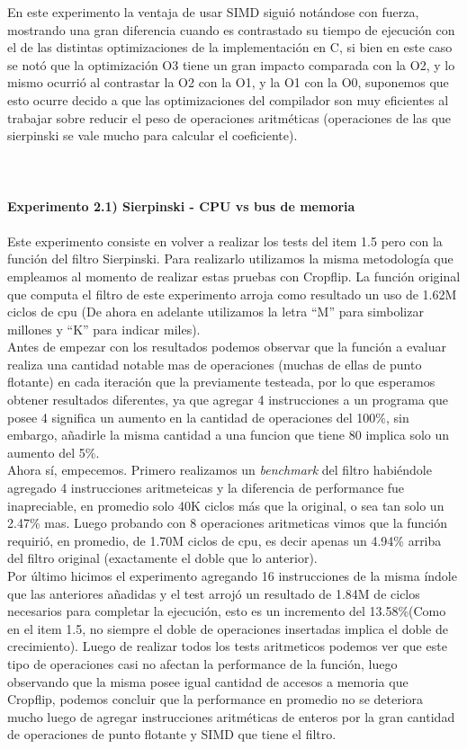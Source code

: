 \documentclass[a4paper]{article}
\begin{document}
En este experimento la ventaja de usar SIMD sigui\'{o} not\'{a}ndose con fuerza, mostrando una gran diferencia cuando es contrastado su tiempo de ejecuci\'{o}n con el de las distintas optimizaciones de la implementaci\'{o}n en C, si bien en este caso se not\'{o} que la optimizaci\'{o}n O3 tiene un gran impacto comparada con la O2, y lo mismo ocurri\'{o} al contrastar la O2 con la O1, y la O1 con la O0, suponemos que esto ocurre decido a que las optimizaciones del compilador son muy eficientes al trabajar sobre reducir el peso de operaciones aritm\'{e}ticas (operaciones de las que sierpinski se vale mucho para calcular el coeficiente).\\ \\ \\ \\

\textbf{Experimento 2.1) Sierpinski - CPU vs bus de memoria}\\ \\
Este experimento consiste en volver a realizar los tests del item 1.5 pero con la funci\'{o}n del filtro Sierpinski. Para realizarlo utilizamos la misma metodolog\'{i}a que empleamos al momento de realizar estas pruebas con Cropflip. La funci\'{o}n original que computa el filtro de este experimento arroja como resultado un uso de 1.62M ciclos de cpu (De ahora en adelante utilizamos la letra “M” para simbolizar millones y “K” para indicar miles). \\
Antes de empezar con los resultados podemos observar que la funci\'{o}n a evaluar realiza una cantidad notable mas de operaciones (muchas de ellas de punto flotante) en cada iteraci\'{o}n que la previamente testeada, por lo que esperamos obtener resultados diferentes, ya que agregar 4 instrucciones a un programa que posee 4 significa un aumento en la cantidad de operaciones del 100\%, sin embargo, añadirle la misma cantidad a una funcion que tiene 80 implica solo un aumento del 5\%. \\
Ahora s\'{i}, empecemos. Primero realizamos un \textit{benchmark} del filtro habi\'{e}ndole agregado 4 instrucciones aritmeteicas y la diferencia de performance fue inapreciable, en promedio solo 40K ciclos m\'{a}s que la original, o sea tan solo un 2.47\% mas. Luego probando con 8 operaciones aritmeticas vimos que la funci\'{o}n requiri\'{o}, en promedio, de 1.70M ciclos de cpu, es decir apenas un 4.94\% arriba del filtro original (exactamente el doble que lo anterior). \\ 
Por \'{u}ltimo hicimos el experimento agregando 16 instrucciones de la misma \'{i}ndole que las anteriores añadidas y el test arroj\'{o} un resultado de 1.84M de ciclos necesarios para completar la ejecuci\'{o}n, esto es un incremento del 13.58\%(Como en el item 1.5, no siempre el doble de operaciones insertadas implica el doble de crecimiento). Luego de realizar todos los tests aritmeticos podemos ver que este tipo de operaciones casi no afectan  la performance de la funci\'{o}n, luego observando que la misma posee igual cantidad de accesos a memoria que Cropflip, podemos concluir que la performance en promedio no se deteriora mucho luego de agregar instrucciones aritm\'{e}ticas de enteros por la gran cantidad de operaciones de punto flotante y SIMD que tiene el filtro. \\
\end{document}
